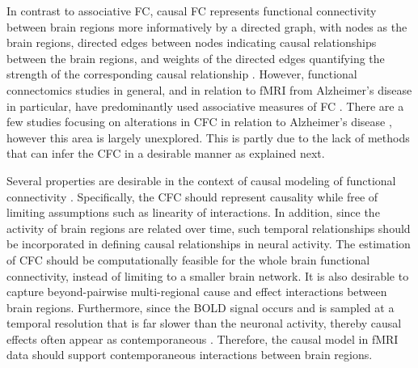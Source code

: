 \documentclass[12pt,reqno]{amsart}
\theoremstyle{definition}
\begin{document}
In contrast to associative FC, causal FC represents functional connectivity between brain regions more informatively by a directed graph, with nodes as the brain regions, directed edges between nodes indicating causal relationships between the brain regions, and weights of the directed edges quantifying the strength of the corresponding causal relationship \citep{spirtes2000causation}. However, functional connectomics studies in general, and in relation to fMRI from Alzheimer's disease in particular, have predominantly used associative measures of FC \citep{reid2019advancing}. There are a few studies focusing on alterations in CFC in relation to Alzheimer's disease \citep{rytsar2011inhibition, khatri2021diagnosis}, however this area is largely unexplored. This is partly due to the lack of methods that can infer the CFC in a desirable manner as explained next.

Several properties are desirable in the context of causal modeling of functional connectivity \citep{biswas2021statistical, smith2011network}. Specifically, the CFC should represent causality while free of limiting assumptions such as linearity of interactions. In addition, since the activity of brain regions are related over time, such temporal relationships should be incorporated in defining causal relationships in neural activity. The estimation of CFC should be computationally feasible for the whole brain functional connectivity, instead of limiting to a smaller brain network. It is also desirable to capture beyond-pairwise multi-regional cause and effect interactions between brain regions. Furthermore, since the BOLD signal occurs and is sampled at a temporal resolution that is far slower than the neuronal activity, thereby causal effects often appear as contemporaneous \citep{granger1969investigating, smith2011network}. Therefore, the causal model in fMRI data should support contemporaneous interactions between brain regions.
\end{document}

